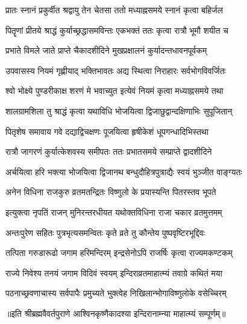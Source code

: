 \twolineshloka
{प्रातः स्नानं प्रकुर्वीत श्रद्वायु तेन चेतसा}
{ततो मध्याह्नसमये स्नानं कृत्वा बहिर्जल} %

\twolineshloka
{पितॄणां प्रीतये श्राद्धं कुर्याच्छ्रद्धासमविन्तः}
{एकभक्तं ततः कृत्वा रात्रौ भूमौ शयीत च} %

\twolineshloka
{प्रभाते विमले जाते प्राप्ते चैकादशीदिने}
{मुखप्रक्षालनं कुर्यादन्तधावनपूर्वकम्} %

\twolineshloka
{उपवासस्य नियमं गृह्णीयाद् भक्तिभावतः}
{अद्य स्थित्वा निराहारः सर्वभोगविवर्जितः} %

\twolineshloka
{श्वो भोक्ष्ये पुण्डरीकाक्ष शरणं मे भवाच्युत}
{इत्येवं नियमं कृत्वा मध्याह्नसमये तथा} %

\twolineshloka
{शालग्रामशिला तु श्राद्धं कृत्वा यथाविधि}
{भोजयित्वा द्विजाछुद्वान्दक्षिणाभिः सुपूजितान्} %

\twolineshloka
{पितृशेष समावाय गवे दद्याद्विचक्षणः}
{पूजयित्वा हृषीकेशं धूपगन्धादिभिस्तथा} %

\twolineshloka
{रात्रौ जागरणं कुर्यात्केशवस्य समीपतः}
{ततः प्रभातसमये सम्प्राप्ते द्वादशीदिने} %

\twolineshloka
{अर्चयित्वा हरि भक्त्या भोजयित्वा द्विजानथ}
{बन्धुदौहित्रपुत्राद्यैः स्वयं भुञ्जीत वाङ्ग्यतः} %

\twolineshloka
{अनेन विधिना राजकुरु व्रतमतन्द्रितः}
{विष्णुलो के प्रयास्यन्ति पितरस्तव भूपते} %

\twolineshloka
{इत्युक्त्वा नृपतिं राजन् मुनिरन्तरधीयत}
{यथोक्तविधिना राजा चकार व्रतमुत्तमम्} %

\twolineshloka
{अन्तःपुरेण सहितः पुत्रभृत्यसमन्वितः}
{कृते व्रते तु कौन्तेय पुष्पवृष्टिरभूद्दिवः} %

\twolineshloka
{तत्पिता गरुडारूढो जगाम हरिमन्दिरम्}
{इन्द्रसेनोऽपि राजर्षिः कृत्वा राज्यमकण्टकम्} %

\twolineshloka
{राज्ये निवेश्य तनयं जगाम विदिवं स्वयम्}
{इन्दिराव्रतमाहात्म्यं तवाग्रे कथितं मया} %

\twolineshloka
{पठनाच्छ्रवणाचास्य सर्वपापैः प्रमुच्यते}
{भुक्त्वेह निखिलान्भोगाविष्णुलोके वसेच्चिरम्} %

॥इति श्रीब्रह्मवैवर्तपुराणे आश्विनकृष्णैकादश्या इन्दिरानाम्न्या माहात्म्यं सम्पूर्णम्॥


\hyperref[sec:ekadashi_mahatmyam_vrata_raja]{\closesub}
\clearpage

\label{sec:vrata-raja-ashvina-shukla-pashankusha}


